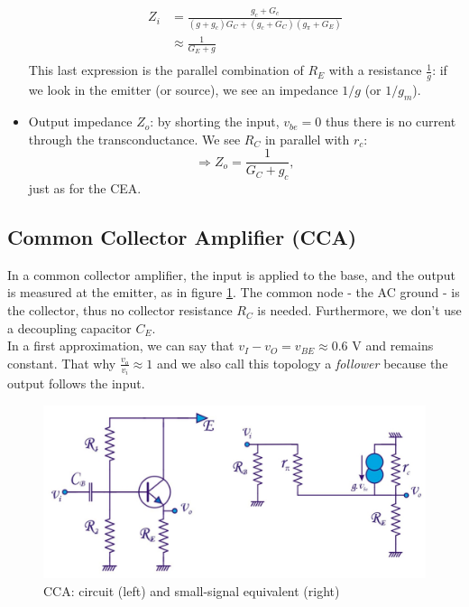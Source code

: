 \begin{itemize}
	\begin{equation}
		\begin{split}
			Z_i &= \frac{g_c + G_c}{(g+g_c) G_C + (g_c + G_C) (g_{\pi} + G_E)} \\
				&\approx \frac{1}{G_E + g}\\
		\end{split}
	\end{equation}
	This last expression is the parallel combination of $R_E$ with a resistance $\frac{1}{g}$: if we look in the emitter (or source), we see an impedance $1/g$ (or $1/g_m$).	
	\item Output impedance $Z_o$: by shorting the input, $v_{be} = 0$ thus there is no current through the transconductance. We see $R_C$ in parallel with $r_c$:
	$$ \Rightarrow Z_o = \frac{1}{G_C + g_c},$$
	just as for the CEA.
\end{itemize}


\subsection{Common Collector Amplifier (CCA)}
\label{sec:cca}
In a common collector amplifier, the input is applied to the base, and the output is measured at the emitter, as in figure \ref{fig:amplifier9}. The common node - the AC ground - is the collector, thus no collector resistance $R_C$ is needed. Furthermore, we don't use a decoupling capacitor $C_E$.\\
In a first approximation, we can say that $v_I - v_O = v_{BE} \approx 0.6$ V and remains constant. That why $\frac{v_o}{v_i} \approx 1$ and we also call this topology a \emph{follower} because the output follows the input.
\begin{figure}[h!]
	\centering
	\includegraphics[width=14cm]{figures/ch02/amplifier9.jpg}
	\caption{CCA: circuit (left) and small-signal equivalent (right)}
	\label{fig:amplifier9}
\end{figure}

